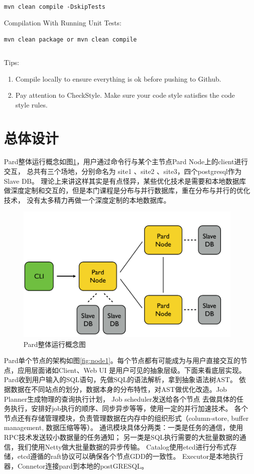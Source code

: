 \documentclass[a4paper, 12pt]{ctexart}
\begin{document}
\lstinline|mvn clean compile -DskipTests|
 
 Compilation With Running Unit Tests:
 
\lstinline|mvn clean package or mvn clean compile|
 
\begin{lstlisting}

\end{lstlisting}
 
 Tips:
\begin{enumerate}[1]
 	\item Compile locally to ensure everything is ok before pushing to Github.
 	\item Pay attention to CheckStyle. Make sure your code style satisfies the code style rules.
 \end{enumerate}
 
 
 
\section{总体设计}
Pard整体运行概念如图\ref{fig:archi}，用户通过命令行与某个主节点Pard Node上的client进行交互，
总共有三个场地，分别命名为 site1 、site2 、site3，四个postgresql作为Slave DB。
理论上来讲这样其实是有点怪异，某些优化技术是需要和本地数据库做深度定制和交互的，但是本门课程是分布与并行数据库，重在分布与并行的优化技术，
没有太多精力再做一个深度定制的本地数据库。

\begin{figure}[htbp]
	\centering
	\includegraphics[width=\linewidth]{figure/architecture.png}
	\caption{Pard整体运行概念图}
	\label{fig:archi}
\end{figure}

Pard单个节点的架构如图\ref{fig:node1}。每个节点都有可能成为与用户直接交互的节点，应用层面诸如Client、Web UI
是用户可见的抽象层级。下面来看底层实现。Pard收到用户输入的SQL语句，先做SQL的语法解析，拿到抽象语法树AST。
依据数据在不同站点的划分，数据本身的分布特性，对AST做优化改造。Job Planner生成物理的查询执行计划，
Job scheduler发送给各个节点
去做具体的任务执行，安排好job执行的顺序、同步异步等等，使用一定的并行加速技术。
各个节点还有存储管理模块，负责管理数据在内存中的组织形式（column-store, buffer management, 数据压缩等等）。
通讯模块具体分两类：一类是任务的通信，使用RPC技术发送较小数据量的任务通知；
另一类是SQL执行需要的大批量数据的通信，我们使用Netty做大批量数据的异步传输。
Catalog使用etcd进行分布式存储，etcd遵循的raft协议可以确保各个节点GDD的一致性。
Executor是本地执行器，Connetor连接pard到本地的postGRESQL。
\end{document}
